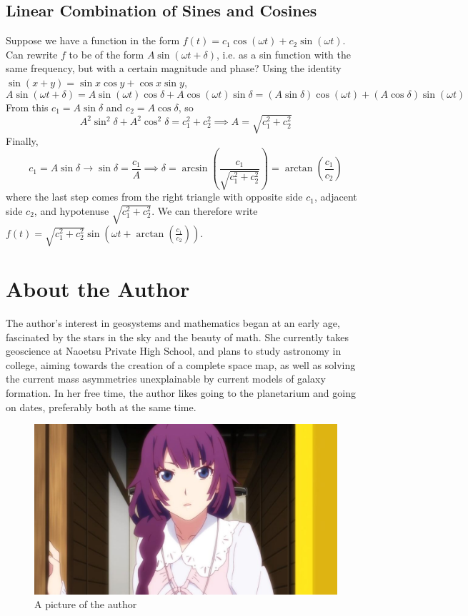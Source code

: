 \documentclass[11pt, oneside]{article}
\theoremstyle{plain}
\theoremstyle{definition}
\begin{document}
\newpage

\subsection{Linear Combination of Sines and Cosines}
\label{subsec:linear}
Suppose we have a function in the form
\( f(t) = c_1 \cos(\omega t) + c_2 \sin(\omega t) \). 
Can rewrite \( f \) to be of the form \( A \sin(\omega t + \delta) \),
i.e. as a sin function with the same frequency, but with a certain magnitude
and phase? Using the identity \( \sin(x + y) = \sin x \cos y + \cos x \sin y \),
\[ A \sin(\omega t + \delta) = A \sin(\omega t)\cos \delta + A\cos(\omega t) \sin \delta
= (A \sin \delta) \cos(\omega t) + (A \cos \delta) \sin(\omega t) \] 
From this \( c_1 = A \sin \delta \) and \( c_2 = A \cos \delta \), so
\[ A^2 \sin^2 \delta + A^2 \cos^2 \delta = c_1^2 + c_2^2
\implies A = \sqrt{c_1^2 + c_2^2} \]
Finally, \[ c_1 = A \sin \delta \rightarrow \sin \delta = \frac{c_1}{A} \implies 
\delta = \arcsin(\frac{c_1}{\sqrt{c_1^2 + c_2^2}})
= \arctan(\frac{c_1}{c_2}) \] 
where the last step comes from the right triangle with opposite side \( c_1 \),
adjacent side \( c_2 \), and hypotenuse \( \sqrt{c_1^2 + c_2^2} \).
We can therefore write
\( f(t) = \sqrt{c_1^2 + c_2^2} \sin(\omega t + \arctan(\frac{c_1}{c_2})) \).

\section{About the Author}
The author's interest in geosystems and mathematics began at an early age,
fascinated by the stars in the sky and the beauty of math. She currently
takes geoscience at Naoetsu Private High School, and plans to study astronomy
in college, aiming towards the creation of a complete space map, as well as
solving the current mass asymmetries unexplainable by current models of galaxy
formation. In her free time, the author likes going to the planetarium and
going on dates, preferably both at the same time.
\begin{figure}[h!]
  \centering
  \includegraphics[scale=0.3]{Hitagi_Rendezvous_1.jpg}
  \caption{A picture of the author}
\end{figure}
\end{document}
